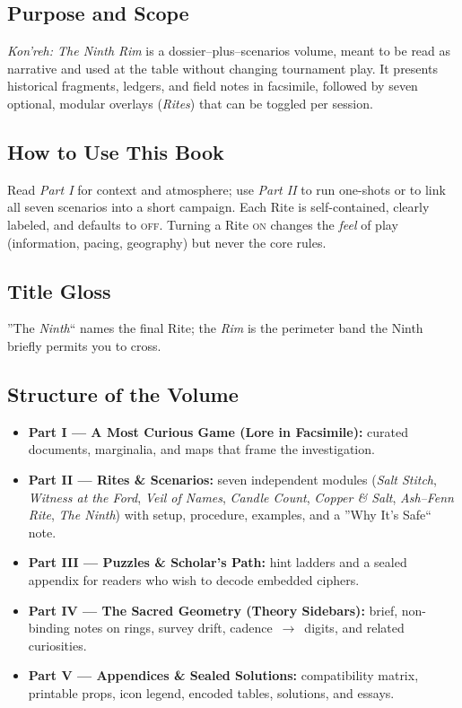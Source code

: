 \documentclass[11pt]{article}
\numberwithin{equation}{section} %
\theoremstyle{plain} %
\theoremstyle{definition} %
\theoremstyle{remark} %
\begin{document}
\subsection{Purpose and Scope}
\textit{Kon'reh: The Ninth Rim} is a dossier--plus--scenarios volume, meant to be read as narrative and used at the table without changing tournament play. It presents historical fragments, ledgers, and field notes in facsimile, followed by seven optional, modular overlays (\emph{Rites}) that can be toggled per session.

\subsection{How to Use This Book}
Read \emph{Part I} for context and atmosphere; use \emph{Part II} to run one-shots or to link all seven scenarios into a short campaign. Each Rite is self-contained, clearly labeled, and defaults to \textsc{off}. Turning a Rite \textsc{on} changes the \emph{feel} of play (information, pacing, geography) but never the core rules.

\subsection{Title Gloss}
''The \emph{Ninth}`` names the final Rite; the \emph{Rim} is the perimeter band the Ninth briefly permits you to cross.

\subsection{Structure of the Volume}
\begin{itemize}
  \item \textbf{Part I --- A Most Curious Game (Lore in Facsimile):} curated documents, marginalia, and maps that frame the investigation.
  \item \textbf{Part II --- Rites \& Scenarios:} seven independent modules (\emph{Salt Stitch}, \emph{Witness at the Ford}, \emph{Veil of Names}, \emph{Candle Count}, \emph{Copper \& Salt}, \emph{Ash--Fenn Rite}, \emph{The Ninth}) with setup, procedure, examples, and a ''Why It's Safe`` note.
  \item \textbf{Part III --- Puzzles \& Scholar's Path:} hint ladders and a sealed appendix for readers who wish to decode embedded ciphers.
  \item \textbf{Part IV --- The Sacred Geometry (Theory Sidebars):} brief, non-binding notes on rings, survey drift, cadence~$\to$~digits, and related curiosities.
  \item \textbf{Part V --- Appendices \& Sealed Solutions:} compatibility matrix, printable props, icon legend, encoded tables, solutions, and essays.
\end{itemize}
\end{document}

